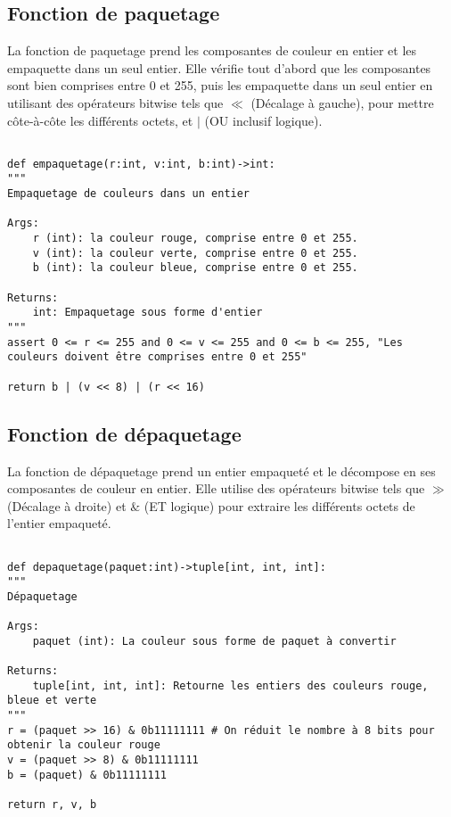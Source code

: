 \documentclass{article}
\begin{document}
\subsection*{Fonction de paquetage}

La fonction de paquetage prend les composantes de couleur en entier et les empaquette dans un seul entier. Elle vérifie tout d'abord que les composantes sont bien comprises entre 0 et 255, puis les empaquette dans un seul entier en utilisant des opérateurs bitwise tels que $\ll$ (Décalage à gauche), pour mettre côte-à-côte les différents octets, et $\vert$ (OU inclusif logique).

\begin{lstlisting}[caption=Fonction de Paquetage]

def empaquetage(r:int, v:int, b:int)->int:
"""
Empaquetage de couleurs dans un entier 

Args:
    r (int): la couleur rouge, comprise entre 0 et 255.
    v (int): la couleur verte, comprise entre 0 et 255.
    b (int): la couleur bleue, comprise entre 0 et 255.

Returns:
    int: Empaquetage sous forme d'entier
"""
assert 0 <= r <= 255 and 0 <= v <= 255 and 0 <= b <= 255, "Les couleurs doivent être comprises entre 0 et 255"

return b | (v << 8) | (r << 16)

\end{lstlisting}

\break\subsection*{Fonction de dépaquetage}

La fonction de dépaquetage prend un entier empaqueté et le décompose en ses composantes de couleur en entier. Elle utilise des opérateurs bitwise tels que $\gg$ (Décalage à droite) et $\&$ (ET logique) pour extraire les différents octets de l'entier empaqueté.

\begin{lstlisting}[caption=Fonction de Paquetage]

def depaquetage(paquet:int)->tuple[int, int, int]:
"""
Dépaquetage 

Args:
    paquet (int): La couleur sous forme de paquet à convertir

Returns:
    tuple[int, int, int]: Retourne les entiers des couleurs rouge, bleue et verte
"""
r = (paquet >> 16) & 0b11111111 # On réduit le nombre à 8 bits pour obtenir la couleur rouge
v = (paquet >> 8) & 0b11111111
b = (paquet) & 0b11111111

return r, v, b

\end{lstlisting}
\end{document}
